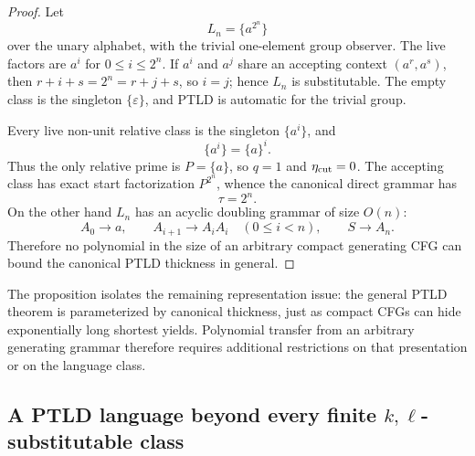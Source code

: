 \documentclass[11pt,a4paper]{article}
\newcommand{\eps}{\varepsilon}
\begin{document}
\begin{proof}
Let
\[
  L_n=\{a^{2^n}\}
\]
over the unary alphabet, with the trivial one-element group observer.
The live factors are $a^i$ for $0\le i\le2^n$.  If $a^i$ and $a^j$
share an accepting context $(a^r,a^s)$, then
$r+i+s=2^n=r+j+s$, so $i=j$; hence $L_n$ is substitutable.  The empty
class is the singleton $\{\eps\}$, and PTLD is automatic for the trivial
group.

Every live non-unit relative class is the singleton $\{a^i\}$, and
\[
  \{a^i\}=\{a\}^i.
\]
Thus the only relative prime is $P=\{a\}$, so $q=1$ and
$\eta_{\rm cut}=0$.  The accepting class has exact start factorization
$P^{2^n}$, whence the canonical direct grammar has
\[
  \tau=2^n.
\]
On the other hand $L_n$ has an acyclic doubling grammar of size $O(n)$:
\[
  A_0\to a,\qquad
  A_{i+1}\to A_iA_i\quad(0\le i<n),\qquad
  S\to A_n.
\]
Therefore no polynomial in the size of an arbitrary compact generating
CFG can bound the canonical PTLD thickness in general.
\end{proof}

The proposition isolates the remaining representation issue: the general
PTLD theorem is parameterized by canonical thickness, just as compact CFGs
can hide exponentially long shortest yields.  Polynomial transfer from an
arbitrary generating grammar therefore requires additional restrictions on
that presentation or on the language class.

\subsection{A PTLD language beyond every finite \texorpdfstring{$k,\ell$}{k,l}-substitutable class}
\end{document}
